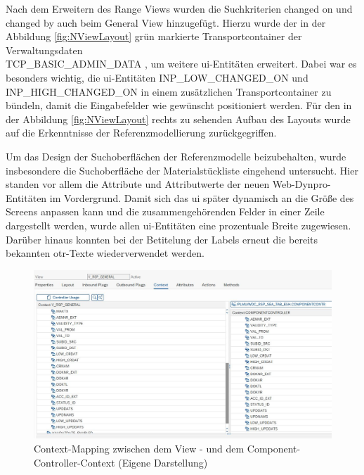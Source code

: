 Nach dem Erweitern des Range Views wurden die Suchkriterien changed on und changed by auch beim General View hinzugefügt. Hierzu wurde der in der Abbildung \ref{fig:NViewLayout} grün markierte Transportcontainer der Verwaltungsdaten \\TCP\_BASIC\_ADMIN\_DATA , um weitere \ac{ui}-Entitäten erweitert. Dabei war es besonders wichtig, 
die \ac{ui}-Entitäten INP\_LOW\_CHANGED\_ON und \\INP\_HIGH\_CHANGED\_ON in einem zusätzlichen Transportcontainer zu bündeln, damit die Eingabefelder wie gewünscht positioniert werden. Für den in der Abbildung \ref{fig:NViewLayout} rechts zu sehenden Aufbau des Layouts wurde auf die Erkenntnisse der Referenzmodellierung zurückgegriffen.


Um das Design der Suchoberflächen der Referenzmodelle beizubehalten, wurde insbesondere die Suchoberfläche der Materialstückliste eingehend untersucht. Hier standen vor allem die Attribute und Attributwerte der neuen Web-Dynpro-Entitäten im Vordergrund. Damit sich das \ac{ui} später dynamisch an die Größe des Screens anpassen kann und die zusammengehörenden Felder in einer Zeile dargestellt werden, wurde allen \ac{ui}-Entitäten eine prozentuale Breite zugewiesen. Darüber hinaus konnten bei der Betitelung der Labels erneut die bereits bekannten \acs{otr}-Texte wiederverwendet werden.

\begin{figure}[htbp]
    \centering
    \includegraphics[width=1\textwidth]{img/ContextMapping.JPG}
    \caption[Context-Mapping zwischen dem View - und dem Component-Controller-Context]{Context-Mapping zwischen dem View - und dem Component-Controller-Context (Eigene Darstellung)}
    \label{fig:ContM}
\end{figure}

